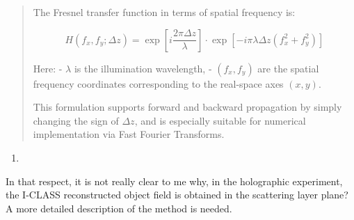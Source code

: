 \documentclass[12pt]{article}
\newenvironment{solved_reviewercomment}
    {\begin{tcolorbox}[width=\linewidth,colback=gray!5,colframe=solved_commentcolor!50,title=Reviewer Comment,left=5pt,right=5pt]}
    {\end{tcolorbox}}
\newenvironment{ourresponse}
    {\begin{tcolorbox}[width=\linewidth,breakable,enhanced,colback=gray!5,colframe=responsecolor!50,title=Response,left=5pt,right=5pt]}
    {\end{tcolorbox}}
\begin{document}
\begin{ourresponse}
\begin{quote}
        The Fresnel transfer function in terms of spatial frequency is:
        
        \begin{equation}
            H(f_x, f_y; \Delta z) = \exp\left[ i \frac{2\pi \Delta z}{\lambda} \right] \cdot \exp\left[ -i \pi \lambda \Delta z (f_x^2 + f_y^2) \right]
        \end{equation}
        
        Here:
        - $ \lambda $ is the illumination wavelength,
        - $ (f_x, f_y) $ are the spatial frequency coordinates corresponding to the real-space axes $ (x, y) $.
        
        This formulation supports forward and backward propagation by simply changing the sign of $ \Delta z $, and is especially suitable for numerical implementation via Fast Fourier Transforms.
        
    \end{quote}

            
\end{ourresponse}


    
\begin{enumerate}[label=\arabic*., resume]
\item \leavevmode
\end{enumerate}
\vspace{-1em}
\begin{solved_reviewercomment}
    In that respect, it is not really clear to me why, in the holographic experiment, the I-CLASS reconstructed object field is obtained in the scattering layer plane? A more detailed description of the method is needed.
\end{solved_reviewercomment}
\end{document}
